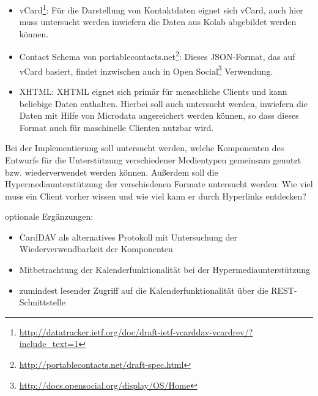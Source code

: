 \documentclass[12pt,a4paper,twoside]{scrartcl}		%
\begin{document}
\begin{itemize}
\item
  vCard\footnote{\url{http://datatracker.ietf.org/doc/draft-ietf-vcarddav-vcardrev/?include_text=1}}:
  Für die Darstellung von Kontaktdaten eignet sich vCard, auch hier muss
  untersucht werden inwiefern die Daten aus Kolab abgebildet werden können.
\item Contact Schema von
  portablecontacts.net\footnote{\url{http://portablecontacts.net/draft-spec.html}}:
  Dieses JSON-Format, das auf vCard basiert, findet inzwischen auch in Open
  Social\footnote{\url{http://docs.opensocial.org/display/OS/Home}} Verwendung.
\item XHTML: XHTML eignet sich primär für menschliche Clients und kann beliebige
  Daten enthalten. Hierbei soll auch untersucht werden, inwiefern die Daten mit
  Hilfe von Microdata angereichert werden können, so dass dieses Format auch für
  maschinelle Clienten nutzbar wird.
\end{itemize}

Bei der Implementierung soll untersucht werden, welche Komponenten des Entwurfs
für die Unterstützung verschiedener Medientypen gemeinsam genutzt
bzw. wiederverwendet werden können. Außerdem soll die Hypermediaunterstützung
der verschiedenen Formate untersucht werden: Wie viel muss ein Client vorher
wissen und wie viel kann er durch Hyperlinks entdecken?

optionale Ergänzungen:

\begin{itemize}
\item CardDAV als alternatives Protokoll mit Untersuchung der
  Wiederverwendbarkeit der Komponenten
\item Mitbetrachtung der Kalenderfunktionalität bei der Hypermediaunterstützung
\item zumindest lesender Zugriff auf die Kalenderfunktionalität über die
  REST-Schnittstelle
\end{itemize}

\tableofcontents{}

\begin{abstract}
\end{abstract}
\newpage{}
\end{document}
